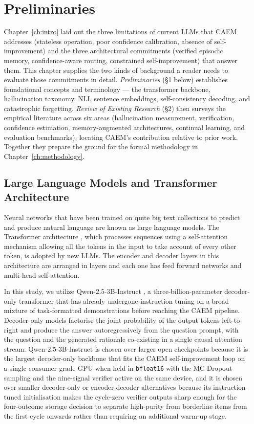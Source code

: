 \section{Preliminaries}

Chapter~\ref{ch:intro} laid out the three limitations of current LLMs that CAEM addresses (stateless operation, poor confidence calibration, absence of self-improvement) and the three architectural commitments (verified episodic memory, confidence-aware routing, constrained self-improvement) that answer them. This chapter supplies the two kinds of background a reader needs to evaluate those commitments in detail. \textit{Preliminaries} (\S1 below) establishes foundational concepts and terminology --- the transformer backbone, hallucination taxonomy, NLI, sentence embeddings, self-consistency decoding, and catastrophic forgetting. \textit{Review of Existing Research} (\S2) then surveys the empirical literature across six areas (hallucination measurement, verification, confidence estimation, memory-augmented architectures, continual learning, and evaluation benchmarks), locating CAEM's contribution relative to prior work. Together they prepare the ground for the formal methodology in Chapter~\ref{ch:methodology}.

\subsection{Large Language Models and Transformer Architecture}

Neural networks that have been trained on quite big text collections to predict and produce natural language are known as large language models. The Transformer architecture \cite{NIPS2017_3f5ee243}, which processes sequences using a self-attention mechanism allowing all the tokens in the input to take account of every other token, is adopted by new LLMs. The encoder and decoder layers in this architecture are arranged in layers and each one has feed forward networks and multi-head self-attention.

In this study, we utilize Qwen-2.5-3B-Instruct \citep{qwen25}, a three-billion-parameter decoder-only transformer that has already undergone instruction-tuning on a broad mixture of task-formatted demonstrations before reaching the CAEM pipeline. Decoder-only models factorise the joint probability of the output tokens left-to-right and produce the answer autoregressively from the question prompt, with the question and the generated rationale co-existing in a single causal attention stream. Qwen-2.5-3B-Instruct is chosen over larger open checkpoints because it is the largest decoder-only backbone that fits the CAEM self-improvement loop on a single consumer-grade GPU when held in \texttt{bfloat16} with the MC-Dropout sampling and the nine-signal verifier active on the same device, and it is chosen over smaller decoder-only or encoder-decoder alternatives because its instruction-tuned initialisation makes the cycle-zero verifier outputs sharp enough for the four-outcome storage decision to separate high-purity from borderline items from the first cycle onwards rather than requiring an additional warm-up stage.

